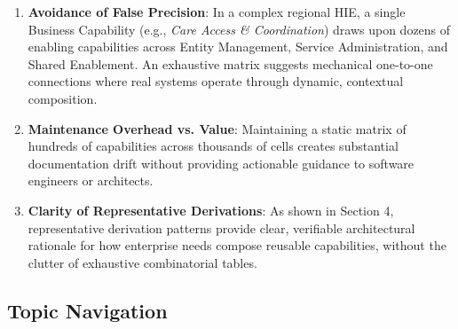 \begin{enumerate}

\item 
\textbf{Avoidance of False Precision}: In a complex regional HIE, a single Business Capability (e.g., \emph{Care Access \& Coordination}) draws upon dozens of enabling capabilities across Entity Management, Service Administration, and Shared Enablement. An exhaustive matrix suggests mechanical one-to-one connections where real systems operate through dynamic, contextual composition.



\item 
\textbf{Maintenance Overhead vs. Value}: Maintaining a static matrix of hundreds of capabilities across thousands of cells creates substantial documentation drift without providing actionable guidance to software engineers or architects.



\item 
\textbf{Clarity of Representative Derivations}: As shown in Section 4, representative derivation patterns provide clear, verifiable architectural rationale for how enterprise needs compose reusable capabilities, without the clutter of exhaustive combinatorial tables.



\end{enumerate}
\label{rad:tier-model:271}

\par\smallskip
{}\label{rad:tier-model:273}
\subsection*{Topic Navigation}
\label{rad:tier-model:275}

